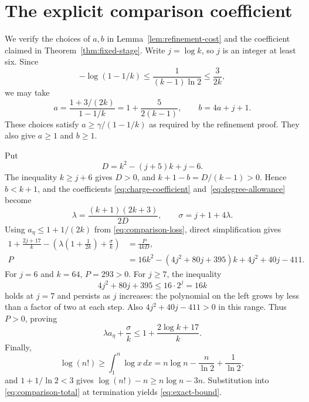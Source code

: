 \section{The explicit comparison coefficient}\label{app:constants}

We verify the choices of $a,b$ in Lemma~\ref{lem:refinement-cost} and the
coefficient claimed in Theorem~\ref{thm:fixed-stage}. Write $j=\log k$,
so $j$ is an integer at least six. Since
\[
-\log(1-1/k)\le\frac1{(k-1)\ln2}\le\frac3{2k},
\]
we may take
\begin{equation}\label{eq:explicit-affine-coefficients}
a=\frac{1+3/(2k)}{1-1/k}
 =1+\frac5{2(k-1)},\qquad b=4a+j+1.
\end{equation}
These choices satisfy $a\ge\gamma/(1-1/k)$ as required by the refinement
proof. They also give $a\ge1$ and $b\ge1$.

Put
\[
D=k^2-(j+5)k+j-6.
\]
The inequality $k\ge j+6$ gives $D>0$, and
$k+1-b=D/(k-1)>0$. Hence $b<k+1$, and the coefficients
\eqref{eq:charge-coefficient} and~\eqref{eq:degree-allowance} become
\[
\lambda=\frac{(k+1)(2k+3)}{2D},\qquad
\sigma=j+1+4\lambda.
\]
Using $a_\eta\le1+1/(2k)$ from \eqref{eq:comparison-loss}, direct
simplification gives
\begin{align}
1+\frac{2j+17}{k}
 -\left(\lambda\left(1+\frac1{2k}\right)+\frac\sigma k\right)
&=\frac{P}{4kD},\label{eq:comparison-charge}\\
P&=16k^2-(4j^2+80j+395)k+4j^2+40j-411.\nonumber
\end{align}
For $j=6$ and $k=64$, $P=293>0$.
For $j\ge7$, the inequality
\[
4j^2+80j+395\le16\cdot2^j=16k
\]
holds at $j=7$ and persists as $j$ increases: the polynomial on the
left grows by less than a factor of two at each step. Also
$4j^2+40j-411>0$ in this range. Thus $P>0$, proving
\[
\lambda a_\eta+\frac\sigma k\le1+\frac{2\log k+17}{k}.
\]
Finally,
\[
\log(n!)\ge\int_1^n\log x\,dx
=n\log n-\frac n{\ln2}+\frac1{\ln2},
\]
and $1+1/\ln2<3$ gives $\log(n!)-n\ge n\log n-3n$.
Substitution into \eqref{eq:comparison-total} at termination yields
\eqref{eq:exact-bound}.
